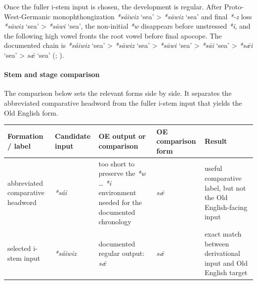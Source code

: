 \documentclass[
  british,
  a4paper,
]{article}
\newcounter{none} %
\providecommand{\Recon}[1]{\emph{*#1}}
\begin{document}
Once the fuller i-stem input is chosen, the development is regular.
After Proto-West-Germanic monophthongization \Recon{sáiwiz} `sea'
\textgreater{} \Recon{sāwiz} `sea' and final \emph{*-z} loss
\Recon{sāwiz} `sea' \textgreater{} \Recon{sāwi} `sea', the non-initial
\emph{*w} disappears before unstressed \emph{*i}, and the following high
vowel fronts the root vowel before final apocope. The documented chain
is \Recon{sáiwiz} `sea' \textgreater{} \Recon{sāwiz} `sea'
\textgreater{} \Recon{sāwi} `sea' \textgreater{} \Recon{sāi} `sea'
\textgreater{} \Recon{sǣi} `sea' \textgreater{} \emph{sǣ} `sea'
(;
).

\paragraph{Stem and stage comparison}\label{stem-and-stage-comparison}

The comparison below sets the relevant forms side by side. It separates
the abbreviated comparative headword from the fuller i-stem input that
yields the Old English form.

{\def\LTcaptype{none} %
\begin{longtable}[]{@{}
  >{\raggedright\arraybackslash}p{}
  >{\raggedright\arraybackslash}p{}
  >{\raggedright\arraybackslash}p{}
  >{\raggedright\arraybackslash}p{}
  >{\raggedright\arraybackslash}p{}@{}}
\toprule\noalign{}
\begin{minipage}[b]{\linewidth}\raggedright
Formation / label
\end{minipage} & \begin{minipage}[b]{\linewidth}\raggedright
Candidate input
\end{minipage} & \begin{minipage}[b]{\linewidth}\raggedright
OE output or comparison
\end{minipage} & \begin{minipage}[b]{\linewidth}\raggedright
OE comparison form
\end{minipage} & \begin{minipage}[b]{\linewidth}\raggedright
Result
\end{minipage} \\
\midrule\noalign{}
\endhead
\bottomrule\noalign{}
\endlastfoot
abbreviated comparative headword & {\emph{*sái}} & too short to preserve
the \emph{*w} \ldots{} \emph{*i} environment needed for the documented
chronology & {\emph{sǣ}} & useful comparative label, but not the Old
English-facing input \\
selected i-stem input & {\emph{*sáiwiz}} & documented regular output:
{\emph{sǣ}} & {\emph{sǣ}} & exact match between derivational input and
Old English target \\
\end{longtable}
}
\end{document}
